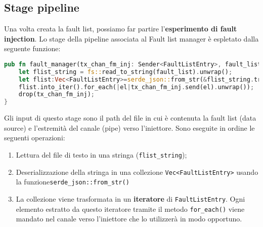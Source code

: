 \subsection{Stage pipeline}
Una volta creata la fault list, possiamo far partire l'\textbf{esperimento di fault injection}. Lo stage della pipeline associata al \textsf{Fault list manager} è espletato dalla seguente funzione: 

\begin{lstlisting}[language=rust, style=boxed]
pub fn fault_manager(tx_chan_fm_inj: Sender<FaultListEntry>, fault_list:String){
    let flist_string = fs::read_to_string(fault_list).unwrap();
    let flist:Vec<FaultListEntry>=serde_json::from_str(&flist_string.trim()).unwrap();
    flist.into_iter().for_each(|el|tx_chan_fm_inj.send(el).unwrap());
    drop(tx_chan_fm_inj);
}
\end{lstlisting}
Gli input di questo stage sono il path del file in cui è contenuta la fault list (data source) e l'estremità del canale (pipe) verso l'iniettore. Sono eseguite in ordine le seguenti operazioni: 
\begin{enumerate}
    \itemsep-0.3em
    \item Lettura del file di testo in una stringa (\texttt{flist\_string});  
    \item Deserializzazione della stringa in una collezione \texttt{Vec<FaultListEntry>} usando la funzione\newline \texttt{serde\_json::from\_str()}
    \item La collezione viene trasformata in un \textbf{iteratore} di \texttt{FaultListEntry}. Ogni elemento estratto da questo iteratore tramite il metodo \texttt{for\_each()} viene mandato nel canale verso l'iniettore che lo utilizzerà in modo opportuno.
\end{enumerate}